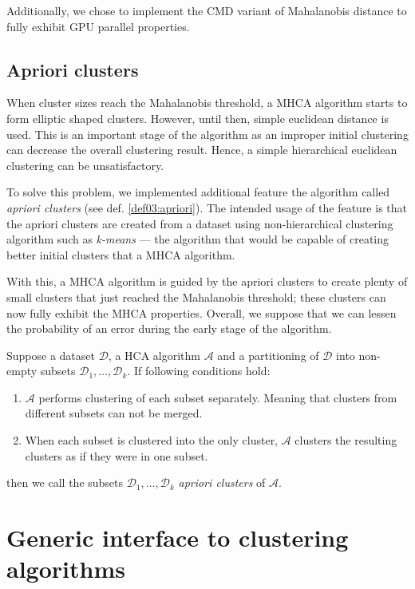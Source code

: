 Additionally, we chose to implement the CMD variant of Mahalanobis distance to fully exhibit GPU parallel properties.

\subsection{Apriori clusters}

When cluster sizes reach the Mahalanobis threshold, a MHCA algorithm starts to form elliptic shaped clusters. However, until then, simple euclidean distance is used. This is an important stage of the algorithm as an improper initial clustering can decrease the overall clustering result. Hence, a simple hierarchical euclidean clustering can be unsatisfactory.

To solve this problem, we implemented additional feature  the algorithm called \emph{apriori clusters} (see def. \ref{def03:apriori}). The intended usage of the feature is that the apriori clusters are created from a dataset using non-hierarchical clustering algorithm such as \emph{k-means} --- the algorithm that would be capable of creating better initial clusters that a MHCA algorithm. 

With this, a MHCA algorithm is guided by the apriori clusters to create plenty of small clusters that just reached the Mahalanobis threshold; these clusters can now fully exhibit the MHCA properties. Overall, we suppose that we can lessen the probability of an error during the early stage of the algorithm.

\begin{defn}[???]
	Suppose a dataset $\mathcal{D}$, a HCA algorithm $\mathcal{A}$ and a partitioning of  $\mathcal{D}$ into non-empty subsets $\mathcal{D}_1,\dots,\mathcal{D}_k$. If following conditions hold:
	\begin{enumerate}
		\item $\mathcal{A}$ performs clustering of each subset separately. Meaning that clusters from different subsets can not be merged.
		\item When each subset is clustered into the only cluster, $\mathcal{A}$ clusters the resulting clusters as if they were in one subset.
	\end{enumerate}
	then we call the subsets $\mathcal{D}_1,\dots,\mathcal{D}_k$ \emph{apriori clusters} of $\mathcal{A}$.
	\label{def03:apriori}
\end{defn}



\section{Generic interface to clustering algorithms}

